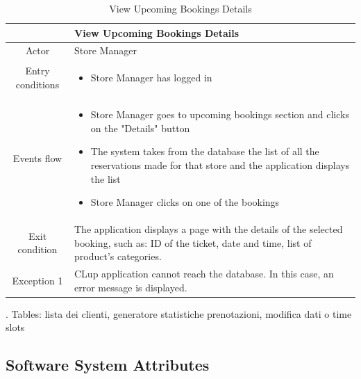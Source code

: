 \documentclass[table, 12pt]{article}
\begin{document}
\begin{longtable}{|c| p{10cm}|}
    \caption{View Upcoming Bookings Details}                                                                                                                             \\
    \hline
                     & View Upcoming Bookings Details                                                                                                                    \\
    \hline
    Actor            & Store Manager                                                                                                                                     \\
    \hline
    Entry conditions & \begin{itemize}
        \item Store Manager has logged in
    \end{itemize}                                                                                                                        \\
    \hline
    Events flow      & \begin{itemize}[nosep,after=\strut]
        \item Store Manager goes to upcoming bookings section and clicks on the "Details" button
        \item The system takes from the database the list of all the reservations made for that store and the application displays the list
        \item Store Manager clicks on one of the bookings
    \end{itemize}                                                                                                                        \\
    \hline
    Exit condition   & The application displays a page with the details of the selected booking, such as: ID of the ticket, date and time, list of product's categories.
    \\
    \hline
    \hline
    Exception 1      & CLup application cannot reach the database. In this case, an error message is displayed.                                                          \\
    \hline
\end{longtable}


\todo . Tables: lista dei clienti, generatore statistiche prenotazioni, modifica dati o time slots

\subsection{Software System Attributes}
\end{document}
